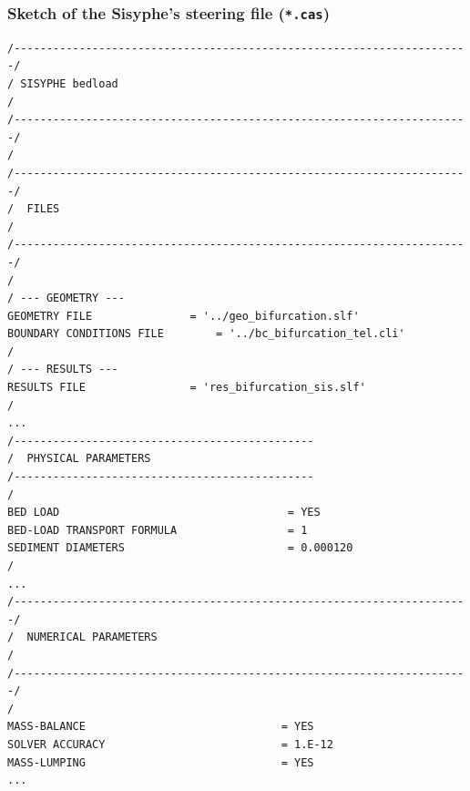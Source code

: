 {\subsubsection{Sketch of the Sisyphe's steering file (\texttt{*.cas})}
\lstset{language=TelemacCas,
        basicstyle=\scriptsize\ttfamily}
\begin{lstlisting}[frame=trBL]
/----------------------------------------------------------------------/
/ SISYPHE bedload                                                      /
/----------------------------------------------------------------------/
/
/----------------------------------------------------------------------/
/  FILES                                                               /
/----------------------------------------------------------------------/
/
/ --- GEOMETRY ---
GEOMETRY FILE				= '../geo_bifurcation.slf'
BOUNDARY CONDITIONS FILE		= '../bc_bifurcation_tel.cli'
/
/ --- RESULTS ---
RESULTS FILE				= 'res_bifurcation_sis.slf'
/
...
/----------------------------------------------
/  PHYSICAL PARAMETERS
/----------------------------------------------
/
BED LOAD                                   = YES
BED-LOAD TRANSPORT FORMULA                 = 1
SEDIMENT DIAMETERS                         = 0.000120
/
...
/----------------------------------------------------------------------/
/  NUMERICAL PARAMETERS                                                /
/----------------------------------------------------------------------/
/
MASS-BALANCE                              = YES
SOLVER ACCURACY                           = 1.E-12
MASS-LUMPING                              = YES
...
\end{lstlisting}

}
